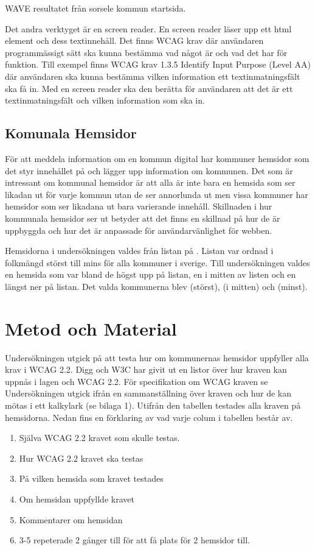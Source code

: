 \documentclass[11p]{article}
\begin{document}
    WAVE resultatet från sorsele kommun startsida.

    Det andra verktyget är en screen reader.
    En screen reader läser upp ett html element och dess textinnehåll.
    Det finns WCAG krav där användaren programmässigt sätt ska kunna bestämma vad något är och vad det har för funktion.
    Till exempel finns WCAG krav 1.3.5 Identify Input Purpose (Level AA) där användaren ska kunna bestämma vilken information ett textinmatningsfält ska få in.
    Med en screen reader ska den berätta för användaren att det är ett textinmatningsfält och vilken information som ska in.

    \subsection{Komunala Hemsidor}
    För att meddela information om en kommun digital har kommuner hemsidor som det styr innehållet på och lägger upp information om kommunen.
    Det som är intressant om kommunal hemsidor är att alla är inte bara en hemsida som ser likadan ut för varje kommun utan de ser annorlunda ut men vissa kommuner har hemsidor som ser likadana ut bara varierande innehåll.
    Skillnaden i hur kommunala hemsidor ser ut betyder att det finns en skillnad på hur de är uppbyggda och hur det är anpassade för användarvänlighet för webben.
    
    Hemsidorna i undersökningen valdes från listan på \textcite{SverigesKommuner}.
    Listan var ordnad i folkmängd störst till mins för alla kommuner i sverige.
    Till undersökningen valdes en hemsida som var bland de högst upp på listan, en i mitten av listen och en längst ner på listan.
    Det valda kommunerna blev \textcite{Linköpings_kommun} (störst), \textcite{Höörs_kommun} (i mitten) och \textcite{Sorsele_kommun} (minst).
    
    \section{Metod och Material}

    Undersökningen utgick på att testa hur om kommunernas hemsidor uppfyller alla krav i WCAG 2.2.
    Digg och W3C har givit ut en listor över hur kraven kan uppnås i lagen och WCAG 2.2.
    För specifikation om WCAG kraven se \textcite{WCAG_2.2}
    Undersökningen utgick ifrån en sammanställning över kraven och hur de kan mötas i ett kalkylark (se bilaga 1).
    Utifrån den tabellen testades alla kraven på hemsidorna.
    Nedan fins en förklaring av vad varje colum i tabellen består av.
    \begin{enumerate}
        \item Själva WCAG 2.2 kravet som skulle testas.
        \item Hur WCAG 2.2 kravet ska testas
        \item På vilken hemsida som kravet testades
        \item Om hemsidan uppfyllde kravet
        \item Kommentarer om hemsidan
        \item 3-5 repeterade 2 gånger till för att få plats för 2 hemsidor till.
    \end{enumerate}
\end{document}

